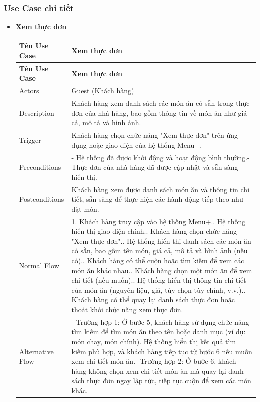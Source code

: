     \subsubsection{Use Case chi tiết}
    \begin{itemize}
        \item \textbf{Xem thực đơn}
        
        \begin{longtable}{|p{3cm}|p{12cm}|}
        \hline
        \textbf{Tên Use Case} & \textbf{Xem thực đơn} \\ 
        \hline
        \endfirsthead
        \hline
        \textbf{Tên Use Case} & \textbf{Xem thực đơn} \\ 
        \endhead
        \hline
        \endfoot
        \hline
        \endlastfoot
        Actors & Guest (Khách hàng) \\ 
        \hline
        Description & Khách hàng xem danh sách các món ăn có sẵn trong thực đơn của nhà hàng, bao gồm thông tin về món ăn như giá cả, mô tả và hình ảnh. \\
        \hline
        Trigger & Khách hàng chọn chức năng "Xem thực đơn" trên ứng dụng hoặc giao diện của hệ thống Menu+. \\
        \hline
        Preconditions & - Hệ thống đã được khởi động và hoạt động bình thường.\newline- Thực đơn của nhà hàng đã được cập nhật và sẵn sàng hiển thị. \\
        \hline
        Postconditions & Khách hàng xem được danh sách món ăn và thông tin chi tiết, sẵn sàng để thực hiện các hành động tiếp theo như đặt món. \\
        \hline
        Normal Flow & 1. Khách hàng truy cập vào hệ thống Menu+.\newline2. Hệ thống hiển thị giao diện chính.\newline3. Khách hàng chọn chức năng "Xem thực đơn".\newline4. Hệ thống hiển thị danh sách các món ăn có sẵn, bao gồm tên món, giá cả, mô tả và hình ảnh (nếu có).\newline5. Khách hàng có thể cuộn hoặc tìm kiếm để xem các món ăn khác nhau.\newline6. Khách hàng chọn một món ăn để xem chi tiết (nếu muốn).\newline7. Hệ thống hiển thị thông tin chi tiết của món ăn (nguyên liệu, giá, tùy chọn tùy chỉnh, v.v.).\newline8. Khách hàng có thể quay lại danh sách thực đơn hoặc thoát khỏi chức năng xem thực đơn. \\
        \hline
        Alternative Flow & - Trường hợp 1: Ở bước 5, khách hàng sử dụng chức năng tìm kiếm để tìm món ăn theo tên hoặc danh mục (ví dụ: món chay, món chính). Hệ thống hiển thị kết quả tìm kiếm phù hợp, và khách hàng tiếp tục từ bước 6 nếu muốn xem chi tiết món ăn.\newline- Trường hợp 2: Ở bước 6, khách hàng không chọn xem chi tiết món ăn mà quay lại danh sách thực đơn ngay lập tức, tiếp tục cuộn để xem các món khác. \\

\end{longtable}
\end{itemize}
